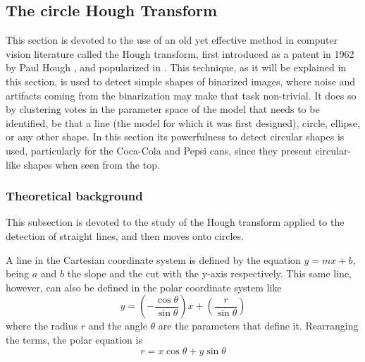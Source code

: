 \documentclass[../main.tex]{subfiles}
\begin{document}
\subsection{The circle Hough Transform}
This section is devoted to the use of an old yet effective method in computer vision literature called the Hough transform, first introduced as a patent in 1962 by Paul Hough \cite{hough1962patent}, and popularized in \cite{ballard1981generalizing_Hough}. This technique, as it will be explained in this section, is used to detect simple shapes of binarized images, where noise and artifacts coming from the binarization may make that task non-trivial. It does so by clustering votes in the parameter space of the model that needs to be identified, be that a line (the model for which it was first designed), circle, ellipse, or any other shape. In this section its powerfulness to detect circular shapes is used, particularly for the Coca-Cola and Pepsi cans, since they present circular-like shapes when seen from the top.

\subsubsection{Theoretical background}
This subsection is devoted to the study of the Hough transform applied to the detection of straight lines, and then moves onto circles.

A line in the Cartesian coordinate system is defined by the equation $y = mx + b$, being $a$ and $b$ the slope and the cut with the y-axis respectively. This same line, however, can also be defined in the polar coordinate system like
\begin{equation}
    y=\left(-\frac{\cos \theta}{\sin \theta}\right) x+\left(\frac{r}{\sin \theta}\right)
\end{equation}
where the radius $r$ and the angle $\theta$ are the parameters that define it. Rearranging the terms, the polar equation is 
\begin{equation} \label{eq:Hough_r}
    r = x \cos \theta + y \sin \theta
\end{equation}
\end{document}
